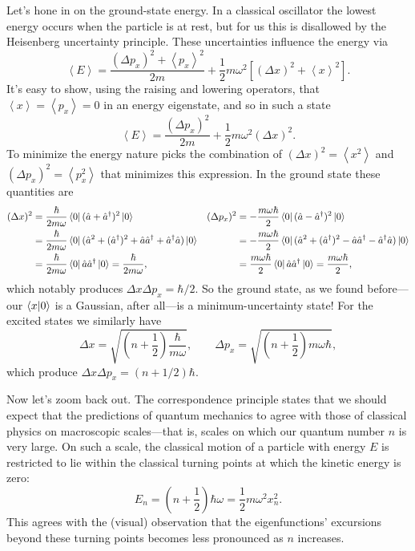 \documentclass[../p116main.tex]{subfiles}
\begin{document}
Let's hone in on the ground-state energy.
In a classical oscillator the lowest energy occurs when the particle is at rest, but for us this is disallowed by the Heisenberg uncertainty principle.
These uncertainties influence the energy via
\[ \left< E \right> = \frac{(\Delta p_x)^2 + \left< p_x \right>^2}{2m} + \frac{1}{2} m\omega^2 [(\Delta x)^2 + \left< x \right>^2]. \]
It's easy to show, using the raising and lowering operators, that $\left< x \right> = \left< p_x \right> = 0$ in an energy eigenstate, and so in such a state
\[ \left< E \right> = \frac{(\Delta p_x)^2}{2m} + \frac{1}{2} m\omega^2 (\Delta x)^2. \]
To minimize the energy nature picks the combination of $(\Delta x)^2 = \left< x^2 \right>$ and $(\Delta p_x)^2 = \left< p_x^2 \right>$ that minimizes this expression.
In the ground state these quantities are
\begin{align*}
    (\Delta x)^2 &= \frac{\hbar}{2m \omega} \left< 0 \right| (\hat a + \hat a^\dagger)^2 \left| 0 \right> & (\Delta p_x)^2 &= -\frac{m\omega \hbar}{2} \left< 0 \right| (\hat a - \hat a^\dagger)^2 \left| 0 \right> \\
    &= \frac{\hbar}{2m \omega} \left< 0 \right| (\hat a^2 + (\hat a^\dagger)^2 + \hat a \hat a^\dagger + \hat a^\dagger \hat a) \left| 0 \right> &&= -\frac{m\omega \hbar}{2} \left< 0 \right| (\hat a^2 + (\hat a^\dagger)^2 - \hat a \hat a^\dagger - \hat a^\dagger \hat a) \left| 0 \right> \\
    &= \frac{\hbar}{2m\omega} \left< 0 \right| \hat a \hat a^\dagger \left| 0 \right> = \frac{\hbar}{2m\omega}, &&= \frac{m\omega \hbar}{2} \left< 0 \right| \hat a \hat a^\dagger \left| 0 \right> = \frac{m\omega\hbar}{2},
\end{align*}
which notably produces $\Delta x \Delta p_x = \hbar / 2$.
So the ground state, as we found before---our $\left< x \middle| 0 \right>$ is a Gaussian, after all---is a minimum-uncertainty state!
For the excited states we similarly have
\[ \Delta x = \sqrt{\left( n + \frac{1}{2} \right) \frac{\hbar}{m\omega}}, \qquad \Delta p_x = \sqrt{\left( n + \frac{1}{2} \right) m\omega \hbar}, \]
which produce $\Delta x \Delta p_x = (n + 1 / 2) \hbar$.

Now let's zoom back out.
The correspondence principle states that we should expect that the predictions of quantum mechanics to agree with those of classical physics on macroscopic scales---that is, scales on which our quantum number $n$ is very large.
On such a scale, the classical motion of a particle with energy $E$ is restricted to lie within the classical turning points at which the kinetic energy is zero:
\[ E_n = \left( n + \frac{1}{2} \right) \hbar \omega = \frac{1}{2} m \omega^2 x_n^2. \]
This agrees with the (visual) observation that the eigenfunctions' excursions beyond these turning points becomes less pronounced as $n$ increases.
\end{document}

